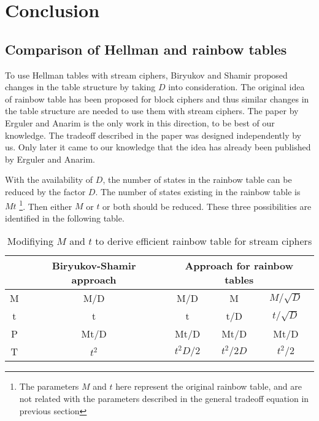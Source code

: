 \chapter{Conclusion}
\label{chap:conclusion}

\section{Comparison of Hellman and rainbow tables}
\label{sec:compare-hellman-rainbow}

To use Hellman tables with stream ciphers, Biryukov and Shamir proposed changes in the table structure by taking $D$ into consideration. The original idea of rainbow table has been proposed for block ciphers and thus similar changes in the table structure are needed to use them with stream ciphers. The paper \cite{erguler2005nct} by Erguler and Anarim is the only work in this direction, to be best of our knowledge. The tradeoff described in the paper was designed independently by us. Only later it came to our knowledge that the idea has already been published by Erguler and Anarim.

With the availability of $D$, the number of states in the rainbow table can be reduced by the factor $D$. The number of states existing in the rainbow table is $Mt$ \footnote{The parameters $M$ and $t$ here represent the original rainbow table, and are not related with the parameters described in the general tradeoff equation in previous section}. Then either $M$ or $t$ or both should be reduced. These three possibilities are identified in the following table. 

\begin{table}[ht!]
\begin{center}
\begin{tabular}{|c||c||c c c|}
\hline
			& Biryukov-Shamir approach 	& \multicolumn{3}{c|}{Approach for rainbow tables}					\\ \hline \hline
M			&	M/D		&	M/D				&	M						& $M/\sqrt{D}$	\\
t			&	t			&	t					&	t/D					& $t/\sqrt{D}$	\\ \hline \hline
P			&	Mt/D	&	Mt/D			&	Mt/D				& Mt/D					\\ 
T			&	$t^2$	&	$t^2D/2$	&	$t^2/2D$		& $t^2/2$				\\ \hline
\end{tabular}
\end{center} 
\caption{Modifiying $M$ and $t$ to derive efficient rainbow table for stream ciphers}
\label{tab:parameters-rainbow-table}
\end{table}

